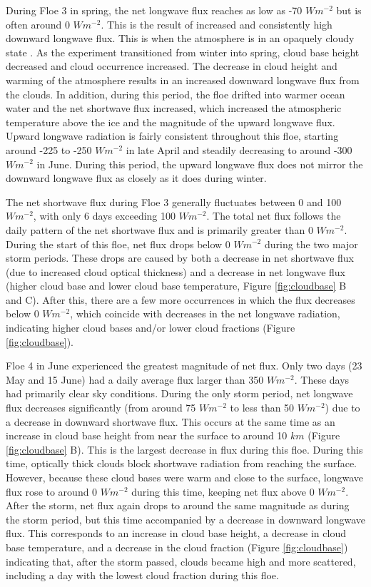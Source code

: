During Floe 3 in spring, the net longwave flux reaches as low as -70 $W m^{-2}$ but is often around 0 $W m^{-2}$. This is the result of increased and consistently high downward longwave flux. This is when the atmosphere is in an opaquely cloudy state \citep{stramler:, graham:2017}. As the experiment transitioned from winter into spring, cloud base height decreased and cloud occurrence increased. The decrease in cloud height and warming of the atmosphere results in an increased downward longwave flux from the clouds. In addition, during this period, the floe drifted into warmer ocean water \citep{kayser:2017} and the net shortwave flux increased, which increased the atmospheric temperature above the ice and the magnitude of the upward longwave flux. Upward longwave radiation is fairly consistent throughout this floe, starting around -225 to -250 $W m^{-2}$ in late April and steadily decreasing to around -300 $W m^{-2}$ in June. During this period, the upward longwave flux does not mirror the downward longwave flux as closely as it does during winter.

The net shortwave flux during Floe 3 generally fluctuates between 0 and 100 $W m^{-2}$, with only 6 days exceeding 100 $W m^{-2}$. The total net flux follows the daily pattern of the net shortwave flux and is primarily greater than 0 $W m^{-2}$. During the start of this floe, net flux drops below 0 $W m^{-2}$ during the two major storm periods. These drops are caused by both a decrease in net shortwave flux (due to increased cloud optical thickness) and a decrease in net longwave flux (higher cloud base and lower cloud base temperature, Figure \ref{fig:cloudbase} B and C). After this, there are a few more occurrences in which the flux decreases below 0 $W m^{-2}$, which coincide with decreases in the net longwave radiation, indicating higher cloud bases and/or lower cloud fractions (Figure \ref{fig:cloudbase}).  

Floe 4 in June experienced the greatest magnitude of net flux. Only two days (23 May and 15 June) had a daily average flux larger than 350 $W m^{-2}$. These days had primarily clear sky conditions. During the only storm period, net longwave flux decreases significantly (from around 75 $W m^{-2}$ to less than 50 $W m^{-2}$) due to a decrease in downward shortwave flux. This occurs at the same time as an increase in cloud base height from near the surface to around 10 $km$ (Figure \ref{fig:cloudbase} B). This is the largest decrease in flux during this floe. During this time, optically thick clouds block shortwave radiation from reaching the surface. However, because these cloud bases were warm and close to the surface, longwave flux rose to around 0 $W m^{-2}$ during this time, keeping net flux above 0 $W m^{-2}$. After the storm, net flux again drops to around the same magnitude as during the storm period, but this time accompanied by a decrease in downward longwave flux. This corresponds to an increase in cloud base height, a decrease in cloud base temperature, and a decrease in the cloud fraction (Figure \ref{fig:cloudbase}) indicating that, after the storm passed, clouds became high and more scattered, including a day with the lowest cloud fraction during this floe. 

